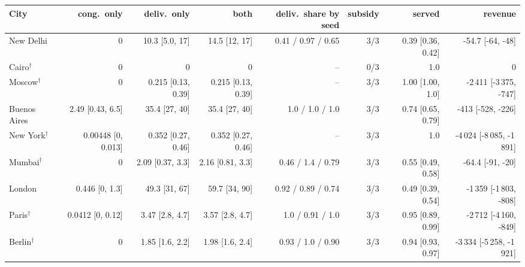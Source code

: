 \begin{tabular}{lrrrrrrr}
\toprule
City & cong.\ only & deliv.\ only & both & deliv.\ share by seed & subsidy & served & revenue \\
\midrule
New Delhi & 0 & 10.3 [5.0, 17] & 14.5 [12, 17] & 0.41 / 0.97 / 0.65 & 3/3 & 0.39 [0.36, 0.42] & -54.7 [-64, -48] \\
Cairo$^\dagger$ & 0 & 0 & 0 & -- & 0/3 & 1.0 & 0 \\
Moscow$^\dagger$ & 0 & 0.215 [0.13, 0.39] & 0.215 [0.13, 0.39] & -- & 3/3 & 1.00 [1.00, 1.0] & -2\,411 [-3\,375, -747] \\
Buenos Aires & 2.49 [0.43, 6.5] & 35.4 [27, 40] & 35.4 [27, 40] & 1.0 / 1.0 / 1.0 & 3/3 & 0.74 [0.65, 0.79] & -413 [-528, -226] \\
New York$^\dagger$ & 0.00448 [0, 0.013] & 0.352 [0.27, 0.46] & 0.352 [0.27, 0.46] & -- & 3/3 & 1.0 & -4\,024 [-8\,085, -1\,891] \\
Mumbai$^\dagger$ & 0 & 2.09 [0.37, 3.3] & 2.16 [0.81, 3.3] & 0.46 / 1.4 / 0.79 & 3/3 & 0.55 [0.49, 0.58] & -64.4 [-91, -20] \\
London & 0.446 [0, 1.3] & 49.3 [31, 67] & 59.7 [34, 90] & 0.92 / 0.89 / 0.74 & 3/3 & 0.49 [0.39, 0.54] & -1\,359 [-1\,803, -808] \\
Paris$^\dagger$ & 0.0412 [0, 0.12] & 3.47 [2.8, 4.7] & 3.57 [2.8, 4.7] & 1.0 / 0.91 / 1.0 & 3/3 & 0.95 [0.89, 0.99] & -2\,712 [-4\,160, -849] \\
Berlin$^\dagger$ & 0 & 1.85 [1.6, 2.2] & 1.98 [1.6, 2.4] & 0.93 / 1.0 / 0.90 & 3/3 & 0.94 [0.93, 0.97] & -3\,334 [-5\,258, -1\,921] \\
\bottomrule
\end{tabular}

